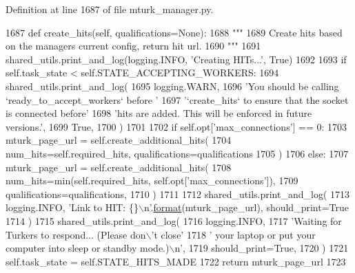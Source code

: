 Definition at line 1687 of file mturk\+\_\+manager.\+py.


\begin{DoxyCode}
1687     \textcolor{keyword}{def }create\_hits(self, qualifications=None):
1688         \textcolor{stringliteral}{"""}
1689 \textcolor{stringliteral}{        Create hits based on the managers current config, return hit url.}
1690 \textcolor{stringliteral}{        """}
1691         shared\_utils.print\_and\_log(logging.INFO, \textcolor{stringliteral}{'Creating HITs...'}, \textcolor{keyword}{True})
1692 
1693         \textcolor{keywordflow}{if} self.task\_state < self.STATE\_ACCEPTING\_WORKERS:
1694             shared\_utils.print\_and\_log(
1695                 logging.WARN,
1696                 \textcolor{stringliteral}{'You should be calling `ready\_to\_accept\_workers` before '}
1697                 \textcolor{stringliteral}{'`create\_hits` to ensure that the socket is connected before'}
1698                 \textcolor{stringliteral}{'hits are added. This will be enforced in future versions.'},
1699                 \textcolor{keyword}{True},
1700             )
1701 
1702         \textcolor{keywordflow}{if} self.opt[\textcolor{stringliteral}{'max\_connections'}] == 0:
1703             mturk\_page\_url = self.create\_additional\_hits(
1704                 num\_hits=self.required\_hits, qualifications=qualifications
1705             )
1706         \textcolor{keywordflow}{else}:
1707             mturk\_page\_url = self.create\_additional\_hits(
1708                 num\_hits=min(self.required\_hits, self.opt[\textcolor{stringliteral}{'max\_connections'}]),
1709                 qualifications=qualifications,
1710             )
1711 
1712         shared\_utils.print\_and\_log(
1713             logging.INFO, \textcolor{stringliteral}{'Link to HIT: \{\}\(\backslash\)n'}.\hyperlink{namespaceparlai_1_1chat__service_1_1services_1_1messenger_1_1shared__utils_a32e2e2022b824fbaf80c747160b52a76}{format}(mturk\_page\_url), should\_print=\textcolor{keyword}{True}
1714         )
1715         shared\_utils.print\_and\_log(
1716             logging.INFO,
1717             \textcolor{stringliteral}{'Waiting for Turkers to respond... (Please don\(\backslash\)'t close'}
1718             \textcolor{stringliteral}{' your laptop or put your computer into sleep or standby mode.)\(\backslash\)n'},
1719             should\_print=\textcolor{keyword}{True},
1720         )
1721         self.task\_state = self.STATE\_HITS\_MADE
1722         \textcolor{keywordflow}{return} mturk\_page\_url
1723 
\end{DoxyCode}
\mbox{\label{classparlai_1_1mturk_1_1core_1_1legacy__2018_1_1mturk__manager_1_1MTurkManager_a0cb662e0432cc407abdee961f0d7d8e0}} 
